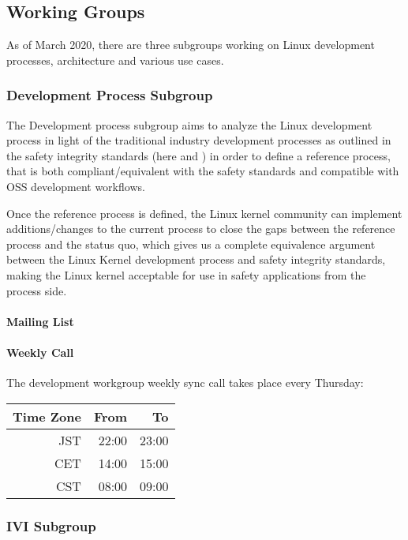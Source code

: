 \documentclass[12pt]{../Common_files/ElisaPaper}
\begin{document}
\subsection{Working Groups}
As of March 2020, there are three subgroups working on Linux development processes, architecture and various use cases.
\subsubsection{Development Process Subgroup}
\label{sssec:Development Process Subgroup}
The Development process subgroup aims to analyze the Linux development process in light of the traditional industry development processes as outlined in the safety integrity standards (here \cite{IEC61508:2010} and \cite{ISO26262:2018}) in order to define a reference process, that is both compliant/equivalent with the safety standards and compatible with OSS development workflows.

Once the reference process is defined, the Linux kernel community can implement additions/changes to the current process to close the gaps between the reference process and the status quo, which gives us a complete equivalence argument between the Linux Kernel development process and safety integrity standards, making the Linux kernel acceptable for use in safety applications from the process side.

\paragraph{Mailing List}

\paragraph{Weekly Call}
The development workgroup weekly sync call takes place every Thursday:

\begin{center}
\begin{tabular}{rrr}
		\toprule
		Time Zone & From & To\\
		\midrule
		JST & 22:00 & 23:00 \\
		CET	& 14:00 & 15:00 \\
		CST & 08:00 & 09:00 \\
	\bottomrule
\end{tabular} 
\end{center}
\subsubsection{IVI Subgroup}
\label{sssec:IVI Subgroup}
\end{document}
